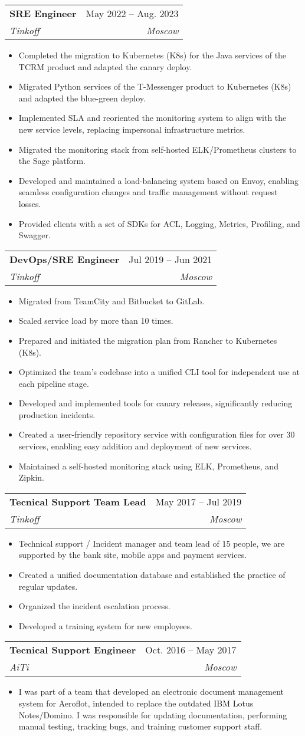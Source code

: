 \documentclass[letterpaper,11pt]{article}
\makeatletter
\newcommand{\resumeItem}[1]{
  \item\small{
    {#1 \vspace{-2pt}}
  }
}
\newcommand{\resumeSubheading}[4]{
  \vspace{-2pt}\item
    \begin{tabular*}{0.97\textwidth}[t]{l@{\extracolsep{\fill}}r}
      \textbf{#1} & #2 \\
      \textit{\small#3} & \textit{\small #4} \\
    \end{tabular*}\vspace{-7pt}
}
\newcommand{\resumeItemListStart}{\begin{itemize}}
\newcommand{\resumeItemListEnd}{\end{itemize}\vspace{-5pt}}
\makeatother
\begin{document}
    \resumeSubheading
      {SRE Engineer}{May 2022 -- Aug. 2023}
      {Tinkoff}{Moscow}
      \resumeItemListStart
        \resumeItem{Completed the migration to Kubernetes (K8s) for the Java services of the TCRM product and adapted the canary deploy.}
        \resumeItem{Migrated Python services of the T-Messenger product to Kubernetes (K8s) and adapted the blue-green deploy.}
        \resumeItem{Implemented SLA and reoriented the monitoring system to align with the new service levels, replacing impersonal infrastructure metrics.}
        \resumeItem{Migrated the monitoring stack from self-hosted ELK/Prometheus clusters to the Sage platform.}
        \resumeItem{Developed and maintained a load-balancing system based on Envoy, enabling seamless configuration changes and traffic management without request losses.}
        \resumeItem{Provided clients with a set of SDKs for ACL, Logging, Metrics, Profiling, and Swagger.}
    \resumeItemListEnd
    \resumeSubheading
      {DevOps/SRE Engineer}{Jul 2019 -- Jun 2021}
      {Tinkoff}{Moscow}
      \resumeItemListStart
        \resumeItem{Migrated from TeamCity and Bitbucket to GitLab.}
        \resumeItem{Scaled service load by more than 10 times.}
        \resumeItem{Prepared and initiated the migration plan from Rancher to Kubernetes (K8s).}
        \resumeItem{Optimized the team's codebase into a unified CLI tool for independent use at each pipeline stage.}
        \resumeItem{Developed and implemented tools for canary releases, significantly reducing production incidents.}
        \resumeItem{Created a user-friendly repository service with configuration files for over 30 services, enabling easy addition and deployment of new services.}
        \resumeItem{Maintained a self-hosted monitoring stack using ELK, Prometheus, and Zipkin.}
    \resumeItemListEnd
    \resumeSubheading
      {Tecnical Support Team Lead}{May 2017 -- Jul 2019}
      {Tinkoff}{Moscow}
      \resumeItemListStart
        \resumeItem{Technical support / Incident manager and team lead of 15 people, we are supported by the bank site, mobile apps and payment services.}
        \resumeItem{Created a unified documentation database and established the practice of regular updates.}
        \resumeItem{Organized the incident escalation process.}
        \resumeItem{Developed a training system for new employees.}
    \resumeItemListEnd

    \resumeSubheading
      {Tecnical Support Engineer}{Oct. 2016 -- May 2017}
      {AiTi}{Moscow}
      \resumeItemListStart
        \resumeItem{I was part of a team that developed an electronic document management system for Aeroflot, intended to replace the outdated IBM Lotus Notes/Domino. I was responsible for updating documentation, performing manual testing, tracking bugs, and training customer support staff.}
      \resumeItemListEnd
\end{document}
